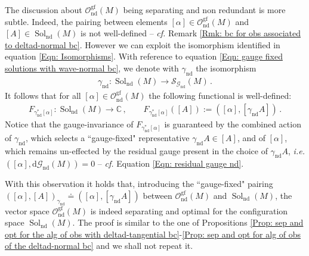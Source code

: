 \noindent The discussion about $\mathcal{O}_{\mathrm{nd}}^{\mathrm{gf}}(M)$ being separating and non redundant is more subtle.
Indeed, the pairing between elements $[\alpha]\in\mathcal{O}_{\mathrm{nd}}^{\mathrm{gf}}(M)$ and $[A]\in\operatorname{Sol}_{\mathrm{nd}}(M)$ is not well-defined -- \textit{cf.} Remark \ref{Rmk: bc for obs associated to deltad-normal bc}.
However we can exploit the isomorphism identified in equation \eqref{Eqn: Isomorphisms}.
With reference to equation \eqref{Eqn: gauge fixed solutions with wave-normal bc}, we denote with $\gamma_{\mathrm{nd}}$ the isomorphism
\begin{align*}
\gamma_{\mathrm{nd}}\colon\operatorname{Sol}_{\mathrm{nd}}(M)\to\mathcal{S}_{\mathcal{G}_{\mathrm{nd}}}(M)\,.
\end{align*}
It follows that for all $[\alpha]\in\mathcal{O}_{\mathrm{nd}}^{\mathrm{gf}}(M)$ the following functional is well-defined:
\begin{align*}
F_{\gamma_{\mathrm{nd}}^*[\alpha]}\colon\operatorname{Sol}_{\mathrm{nd}}(M)\to\mathbb{C}\,,
\qquad
F_{\gamma_{\mathrm{nd}}^*[\alpha]}([A]):=([\alpha],[\gamma_{\mathrm{nd}}A])\,.
\end{align*}
Notice that the gauge-invariance of $F_{\gamma_{\mathrm{nd}}^*[\alpha]}$ is guaranteed by the combined action of $\gamma_{\mathrm{nd}}$, which selects a ``gauge-fixed" representative $\gamma_{\mathrm{nd}}A\in[A]$, and of $[\alpha]$, which remains un-effected by the residual gauge present in the choice of $\gamma_{\mathrm{nd}}A$, \textit{i.e.} $([\alpha],\mathrm{d}\mathcal{G}_{\mathrm{nd}}(M))=0$ -- \textit{cf.} Equation \eqref{Eqn: residual gauge nd}.

\noindent With this observation it holds that, introducing the ``gauge-fixed" pairing $([\alpha],[A])_{\gamma_{\mathrm{nd}}}\doteq([\alpha],[\gamma_{\mathrm{nd}}A])$ between $\mathcal{O}_{\mathrm{nd}}^{\mathrm{gf}}(M)$ and $\operatorname{Sol}_{\mathrm{nd}}(M)$, the vector space $\mathcal{O}_{\mathrm{nd}}^{\mathrm{gf}}(M)$ is indeed separating and optimal for the configuration space $\operatorname{Sol}_{\mathrm{nd}}(M)$.
The proof is similar to the one of Propositions \ref{Prop: sep and opt for the alg of obs with deltad-tangential bc}-\ref{Prop: sep and opt for alg of obs of the deltad-normal bc} and we shall not repeat it.








